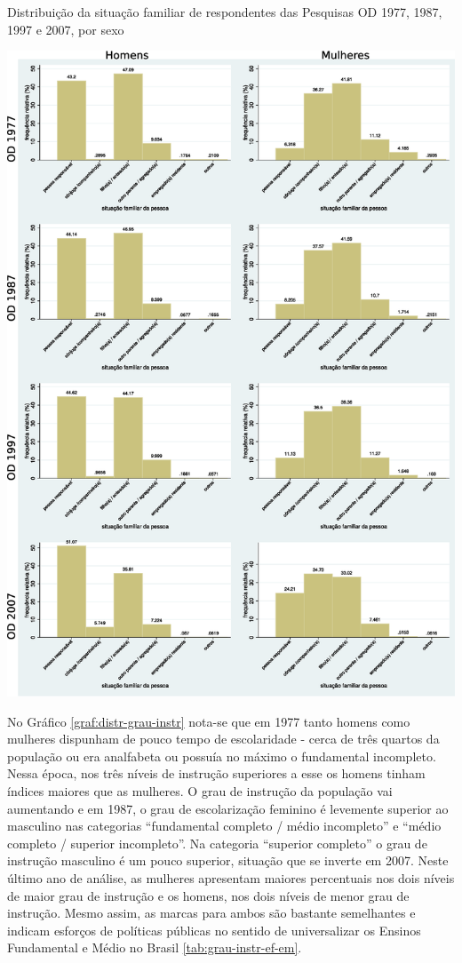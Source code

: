 \begin{grafico}[htb]%
    \caption{\label{graf:distr-sit-fam}Distribuição da situação familiar de respondentes das Pesquisas OD 1977, 1987, 1997 e 2007, por sexo}%
    \begin{center}%
        \includegraphics[width=1\textwidth]{./imagens/sitfam2.eps}%
    \end{center}%
\end{grafico}%

\clearpage

No Gráfico \ref{graf:distr-grau-instr} nota-se que em 1977 tanto homens como mulheres dispunham de pouco tempo de escolaridade - cerca de três quartos da população ou era analfabeta ou possuía no máximo o fundamental incompleto. Nessa época, nos três níveis de instrução superiores a esse os homens tinham índices maiores que as mulheres. O grau de instrução da população vai aumentando e em 1987, o grau de escolarização feminino é levemente superior ao masculino nas categorias ``fundamental completo / médio incompleto'' e ``médio completo / superior incompleto''. Na categoria ``superior completo'' o grau de instrução masculino é um pouco superior, situação que se inverte em 2007. Neste último ano de análise, as mulheres apresentam maiores percentuais nos dois níveis de maior grau de instrução e os homens, nos dois níveis de menor grau de instrução. Mesmo assim, as marcas para ambos são bastante semelhantes e indicam esforços de políticas públicas no sentido de universalizar os Ensinos Fundamental e Médio no Brasil \ref{tab:grau-instr-ef-em}.

